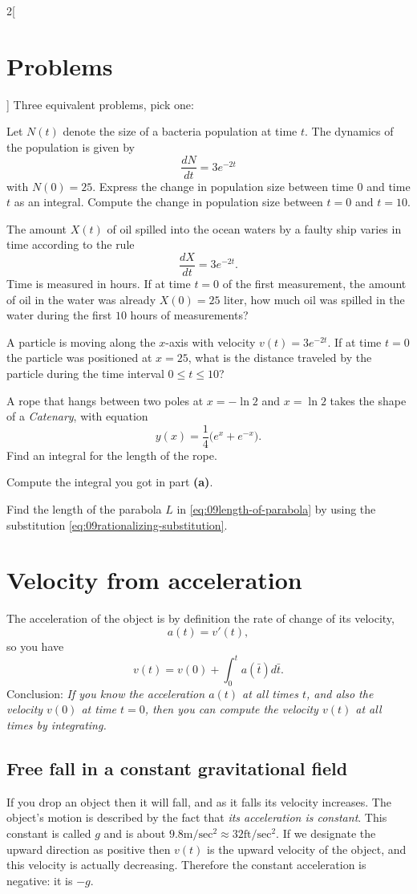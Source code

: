 \begin{multicols}{2}[
\section{Problems}
\problemfont
]
\problem Three equivalent problems, pick one:

\subprob  Let $N(t)$ denote the size of a bacteria population at time $t$.  The
dynamics of the population is given by
\[
  \frac{dN}{dt}=3e^{-2t}
\]
with $N(0)=25$. Express the change in population size between time $0$ and time
$t$ as an integral.  Compute the change in population size between $t=0$ and
$t=10$.

\subprob  The amount $X(t)$ of oil spilled into the ocean waters by a faulty
ship varies in time according to the rule
\[
  \frac{dX}{dt}=3e^{-2t}.
\]
Time is measured in hours. If at time $t=0$ of the first measurement, the amount
of oil in the water was already $X(0)=25$ liter, how much oil was spilled in the
water during the first $10$ hours of measurements?

\subprob  A particle is moving along the $x$-axis with velocity $v(t)=3e^{-2t}$.
If at time $t=0$ the particle was positioned at $x=25$, what is the distance
traveled by the particle during the time interval $0 \leq t \leq 10$?

\problem A rope that hangs between two poles at $x=-\ln 2$ and $x=\ln 2$ takes
the shape of a \textit{Catenary}, with equation
\[
  y(x)=\frac{1}{4}\bigl(e^x+e^{-x}\bigr).
\]
\subprob Find an integral for the length of the rope.

\subprob Compute the integral you got in part \textbf{(a)}.

\problem \label{ex:09length-of-parabola}
Find the length of the parabola $L$ in \eqref{eq:09length-of-parabola}
by using the substitution \eqref{eq:09rationalizing-substitution}.
\end{multicols}
\noproblemfont
\section{Velocity from acceleration}
The acceleration of the object is by definition the rate of change of its
velocity,
\[
a(t) = v'(t),
\]
so you have
\[
v(t) = v(0) + \int_{0}^{t} a(\bar t)d\bar t .
\]
Conclusion: \textit{If you know the acceleration $a(t)$ at all times $t$, and
  also the velocity $v(0)$ at time $t=0$, then you can compute the velocity
  $v(t)$ at all times by integrating.}

\subsection{Free fall in a constant gravitational field}
If you drop an object then it will fall, and as it falls its velocity increases.
The object's motion is described by the fact that \textit{its acceleration is
constant}.  This constant is called $g$ and is about $9.8
\textrm{m}/\textrm{sec}^2 \approx 32\textrm{ft}/\textrm{sec}^2$.  If we
designate the upward direction as positive then $v(t)$ is the upward velocity of
the object, and this velocity is actually decreasing.  Therefore the constant
acceleration is negative: it is $-g$.

